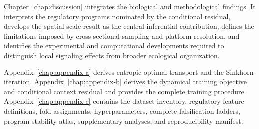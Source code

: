 Chapter~\ref{chap:discussion} integrates the biological and methodological
findings. It interprets the regulatory programs nominated by the conditional
residual, develops the spatial-scale result as the central inferential
contribution, defines the limitations imposed by cross-sectional sampling and
platform resolution, and identifies the experimental and computational
developments required to distinguish local signaling effects from broader
ecological organization.

Appendix~\ref{chap:appendix-a} derives entropic optimal transport and the
Sinkhorn iteration. Appendix~\ref{chap:appendix-b} derives the dynamical
training objective and conditional context residual and provides the
complete training procedure. Appendix~\ref{chap:appendix-c} contains the
dataset inventory, regulatory feature definitions, fold assignments,
hyperparameters, complete falsification ladders, program-stability atlas,
supplementary analyses, and reproducibility manifest.


%
%
%
%
